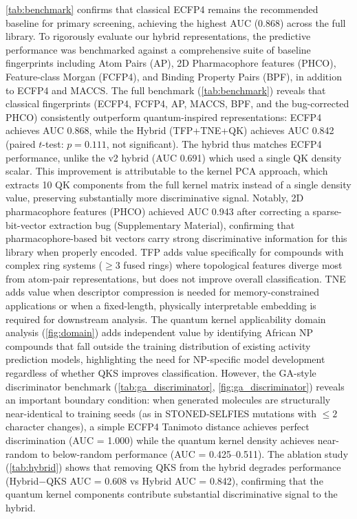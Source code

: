 \documentclass[11pt,a4paper]{article}
\begin{document}
\cref{tab:benchmark} confirms that classical ECFP4 remains the recommended baseline for primary screening, achieving the highest AUC (0.868) across the full library. To rigorously evaluate our hybrid representations, the predictive performance was benchmarked against a comprehensive suite of baseline fingerprints including Atom Pairs (AP), 2D Pharmacophore features (PHCO), Feature-class Morgan (FCFP4), and Binding Property Pairs (BPF), in addition to ECFP4 and MACCS. The full benchmark (\cref{tab:benchmark}) reveals that classical fingerprints (ECFP4, FCFP4, AP, MACCS, BPF, and the bug-corrected PHCO) consistently outperform quantum-inspired representations: ECFP4 achieves AUC 0.868, while the Hybrid (TFP+TNE+QK) achieves AUC 0.842 (paired $t$-test: $p = \num{0.111}$, not significant). The hybrid thus matches ECFP4 performance, unlike the v2 hybrid (AUC 0.691) which used a single QK density scalar. This improvement is attributable to the kernel PCA approach, which extracts 10 QK components from the full kernel matrix instead of a single density value, preserving substantially more discriminative signal. Notably, 2D pharmacophore features (PHCO) achieved AUC 0.943 after correcting a sparse-bit-vector extraction bug (Supplementary Material), confirming that pharmacophore-based bit vectors carry strong discriminative information for this library when properly encoded. TFP adds value specifically for compounds with complex ring systems ($\geq 3$ fused rings) where topological features diverge most from atom-pair representations, but does not improve overall classification. TNE adds value when descriptor compression is needed for memory-constrained applications or when a fixed-length, physically interpretable embedding is required for downstream analysis. The quantum kernel applicability domain analysis (\cref{fig:domain}) adds independent value by identifying African NP compounds that fall outside the training distribution of existing activity prediction models, highlighting the need for NP-specific model development regardless of whether QKS improves classification. However, the GA-style discriminator benchmark (\cref{tab:ga_discriminator}, \cref{fig:ga_discriminator}) reveals an important boundary condition: when generated molecules are structurally near-identical to training seeds (as in STONED-SELFIES mutations with $\leq 2$ character changes), a simple ECFP4 Tanimoto distance achieves perfect discrimination (AUC = \num{1.000}) while the quantum kernel density achieves near-random to below-random performance (AUC = \numrange{0.425}{0.511}). The ablation study (\cref{tab:hybrid}) shows that removing QKS from the hybrid degrades performance (Hybrid$-$QKS AUC = 0.608 vs Hybrid AUC = 0.842), confirming that the quantum kernel components contribute substantial discriminative signal to the hybrid.
\end{document}
